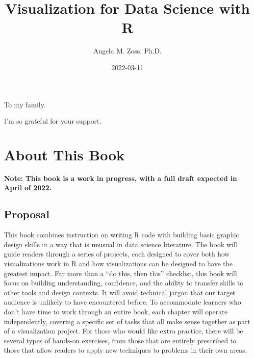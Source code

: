 \documentclass[
]{krantz}
\title{Visualization for Data Science with R}
\author{Angela M. Zoss, Ph.D.}
\date{2022-03-11}
\begin{document}
\maketitle


\thispagestyle{empty}

\begin{center}
To my family.

I'm so grateful for your support.
\end{center}

\setlength{\abovedisplayskip}{-5pt}
\setlength{\abovedisplayshortskip}{-5pt}

{
\hypersetup{linkcolor=}
\setcounter{tocdepth}{2}
\tableofcontents
}
\listoffigures
\listoftables
\hypertarget{about-this-book}{%
\chapter*{About This Book}\label{about-this-book}}


\textbf{Note: This book is a work in progress, with a full draft expected in April of 2022.}

\hypertarget{proposal}{%
\section*{Proposal}\label{proposal}}


This book combines instruction on writing R code with building basic graphic design skills in a way that is unusual in data science literature. The book will guide readers through a series of projects, each designed to cover both how visualizations work in R and how visualizations can be designed to have the greatest impact. Far more than a ``do this, then this'' checklist, this book will focus on building understanding, confidence, and the ability to transfer skills to other tools and design contexts. It will avoid technical jargon that our target audience is unlikely to have encountered before. To accommodate learners who don't have time to work through an entire book, each chapter will operate independently, covering a specific set of tasks that all make sense together as part of a visualization project. For those who would like extra practice, there will be several types of hands-on exercises, from those that are entirely prescribed to those that allow readers to apply new techniques to problems in their own areas.
\end{document}
